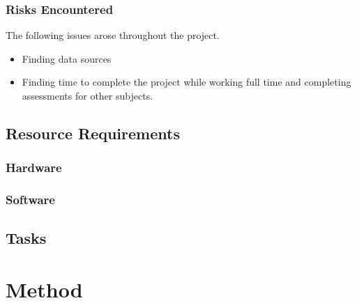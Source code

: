 \documentclass[a4paper,11pt]{article}
\begin{document}
\subsubsection{Risks Encountered}

The following issues arose throughout the project.

\begin{itemize}
  \item Finding data sources
  \item Finding time to complete the project while working full time and
    completing assessments for other subjects.
\end{itemize}

\subsection{Resource Requirements}

\subsubsection{Hardware}

\subsubsection{Software}

\subsection{Tasks}

\section{Method}
\end{document}
